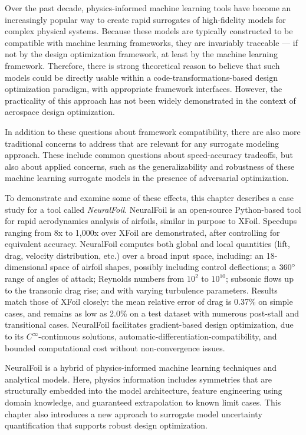 Over the past decade, physics-informed machine learning tools have become an increasingly popular way to create rapid surrogates of high-fidelity models for complex physical systems. Because these models are typically constructed to be compatible with machine learning frameworks, they are invariably traceable — if not by the design optimization framework, at least by the machine learning framework. Therefore, there is strong theoretical reason to believe that such models could be directly usable within a code-transformations-based design optimization paradigm, with appropriate framework interfaces. However, the practicality of this approach has not been widely demonstrated in the context of aerospace design optimization.

In addition to these questions about framework compatibility, there are also more traditional concerns to address that are relevant for any surrogate modeling approach. These include common questions about speed-accuracy tradeoffs, but also about applied concerns, such as the generalizability and robustness of these machine learning surrogate models in the presence of adversarial optimization.

To demonstrate and examine some of these effects, this chapter describes a case study for a tool called \emph{NeuralFoil}. NeuralFoil is an open-source Python-based tool for rapid aerodynamics analysis of airfoils, similar in purpose to XFoil. Speedups ranging from 8x to 1,000x over XFoil are demonstrated, after controlling for equivalent accuracy. NeuralFoil computes both global and local quantities (lift, drag, velocity distribution, etc.) over a broad input space, including: an 18-dimensional space of airfoil shapes, possibly including control deflections; a $360\degree$ range of angles of attack; Reynolds numbers from $10^2$ to $10^{10}$; subsonic flows up to the transonic drag rise; and with varying turbulence parameters. Results match those of XFoil closely: the mean relative error of drag is 0.37\% on simple cases, and remains as low as 2.0\% on a test dataset with numerous post-stall and transitional cases. NeuralFoil facilitates gradient-based design optimization, due to its $C^\infty$-continuous solutions, automatic-differentiation-compatibility, and bounded computational cost without non-convergence issues.

NeuralFoil is a hybrid of physics-informed machine learning techniques and analytical models. Here, physics information includes symmetries that are structurally embedded into the model architecture, feature engineering using domain knowledge, and guaranteed extrapolation to known limit cases. This chapter also introduces a new approach to surrogate model uncertainty quantification that supports robust design optimization.

